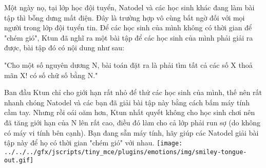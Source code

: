 Một ngày nọ, tại lớp học đội tuyển, Natodel và các học sinh khác đang làm bài tập thì bỗng dưng mất điện. Đây là trường hợp vô cùng bất ngờ đối với mọi người trong lớp đội tuyển tin. Để các học sinh của mình không có thời gian để "chém gió", Ktun đã nghĩ ra một bài tập để các học sinh của mình phải giải ra được, bài tập đó có nội dung như sau:  

   "Cho một số nguyên dương N, bài toán đặt ra là phải tìm tất cả các số X thoả mãn X! có số chữ số bằng N."  

   Ban đầu Ktun chỉ cho giới hạn rất nhỏ để thử các học sinh của mình, thế nên rất nhanh chóng Natodel và các bạn đã giải bài tập này bằng cách bấm máy tính cầm tay. Nhưng rồi oái oăm hơn, Ktun nhất quyết không cho học sinh chơi nên đã tăng giới hạn của N lên rất cao, điều đó làm cho cả lớp phải run sợ (do không có máy vi tính bên cạnh). Bạn đang sẵn máy tính, hãy giúp các Natodel giải bài tập này để họ có thời gian "chém gió" với nhau.   
\texttt{[image: ../../../gfx/jscripts/tiny\_mce/plugins/emotions/img/smiley-tongue-out.gif]}